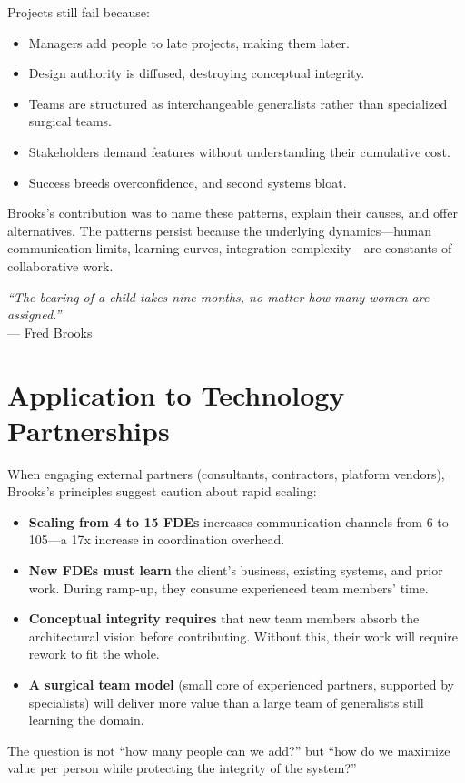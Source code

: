 \documentclass[11pt, letterpaper]{article}
\begin{document}
Projects still fail because:
\begin{itemize}
    \item Managers add people to late projects, making them later.
    \item Design authority is diffused, destroying conceptual integrity.
    \item Teams are structured as interchangeable generalists rather than specialized surgical teams.
    \item Stakeholders demand features without understanding their cumulative cost.
    \item Success breeds overconfidence, and second systems bloat.
\end{itemize}

Brooks's contribution was to name these patterns, explain their causes, and offer alternatives. The patterns persist because the underlying dynamics---human communication limits, learning curves, integration complexity---are constants of collaborative work.

\vspace{1em}

\begin{center}
\textit{``The bearing of a child takes nine months, no matter how many women are assigned.''}\\[0.5em]
--- Fred Brooks
\end{center}

\vspace{1.5em}

\section*{Application to Technology Partnerships}

When engaging external partners (consultants, contractors, platform vendors), Brooks's principles suggest caution about rapid scaling:

\begin{itemize}
    \item \textbf{Scaling from 4 to 15 FDEs} increases communication channels from 6 to 105---a 17x increase in coordination overhead.
    \item \textbf{New FDEs must learn} the client's business, existing systems, and prior work. During ramp-up, they consume experienced team members' time.
    \item \textbf{Conceptual integrity requires} that new team members absorb the architectural vision before contributing. Without this, their work will require rework to fit the whole.
    \item \textbf{A surgical team model} (small core of experienced partners, supported by specialists) will deliver more value than a large team of generalists still learning the domain.
\end{itemize}

The question is not ``how many people can we add?'' but ``how do we maximize value per person while protecting the integrity of the system?''
\end{document}
